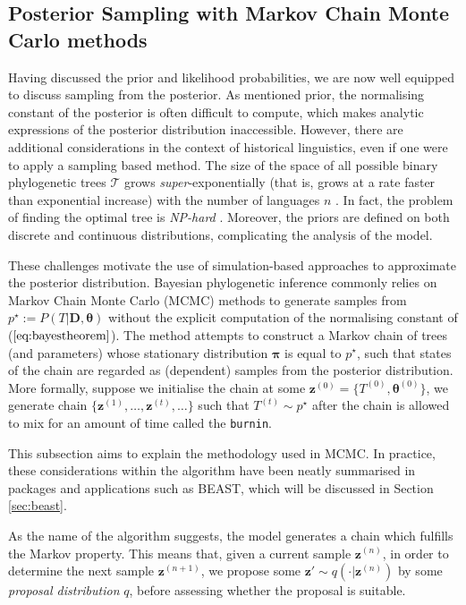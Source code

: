 \subsection{Posterior Sampling with Markov Chain Monte Carlo methods}
\label{sec:mcmc}
Having discussed the prior and likelihood probabilities, we are now well equipped to discuss sampling from the posterior.  As mentioned prior, the normalising constant of the posterior is often difficult to compute, which makes analytic expressions of the posterior distribution inaccessible. However, there are additional considerations in the context of historical linguistics, even if one were to apply a sampling based method. The size of the space of all possible binary phylogenetic trees $\mathcal{T}$ grows \textit{super}-exponentially (that is, grows at a rate faster than exponential increase) with the number of languages $n$ \cite{Schroeder1870}. In fact, the problem of finding the optimal tree is \textit{NP-hard} \cite{Foulds1982}. Moreover, the priors are defined on both discrete and continuous distributions, complicating the analysis of the model.

These challenges motivate the use of simulation-based approaches to approximate the posterior distribution. Bayesian phylogenetic inference commonly relies on Markov Chain Monte Carlo (MCMC) methods to generate samples from $p^\star := P(T | \mathbf{D}, \boldsymbol{\theta})$ without the explicit computation of the normalising constant of ($\ref{eq:bayestheorem}$). The method attempts to construct a Markov chain of trees (and parameters) whose stationary distribution $\boldsymbol{\pi}$ is equal to $p^\star$, such that states of the chain are regarded as (dependent) samples from the posterior distribution. More formally, suppose we initialise the chain at some $\mathbf{z}^{(0)} = \{T^{(0)}, \boldsymbol{\theta}^{(0)}\}$, we generate chain $\{\mathbf{z}^{(1)}, \dots, \mathbf{z}^{(t)}, \dots\}$ such that $T^{(t)} \sim p^\star$ after the chain is allowed to mix for an amount of time called the \texttt{burnin}. 

This subsection aims to explain the methodology used in MCMC. In practice, these considerations within the algorithm have been neatly summarised in packages and applications such as BEAST, which will be discussed in Section \ref{sec:beast}.

As the name of the algorithm suggests, the model generates a chain which fulfills the Markov property. This means that, given a current sample $\mathbf{z}^{(n)}$, in order to determine the next sample $\mathbf{z}^{(n+1)}$, we propose some $\mathbf{z}' \sim q(\cdot | \mathbf{z}^{(n)})$ by some \textit{proposal distribution} $q$, before assessing whether the proposal is suitable. 

